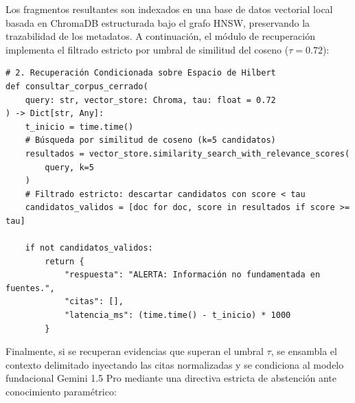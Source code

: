 Los fragmentos resultantes son indexados en una base de datos vectorial local basada en ChromaDB estructurada bajo el grafo HNSW, preservando la trazabilidad de los metadatos. A continuación, el módulo de recuperación implementa el filtrado estricto por umbral de similitud del coseno ($\tau = 0.72$):

\begin{tcolorbox}[colback=bg_marfil, colframe=unmsm_gold, arc=3pt, boxrule=0.6pt, top=0.2cm, bottom=0.2cm, left=0.4cm, right=0.4cm]
\footnotesize
\begin{verbatim}
# 2. Recuperación Condicionada sobre Espacio de Hilbert
def consultar_corpus_cerrado(
    query: str, vector_store: Chroma, tau: float = 0.72
) -> Dict[str, Any]:
    t_inicio = time.time()
    # Búsqueda por similitud de coseno (k=5 candidatos)
    resultados = vector_store.similarity_search_with_relevance_scores(
        query, k=5
    )
    # Filtrado estricto: descartar candidatos con score < tau
    candidatos_validos = [doc for doc, score in resultados if score >= tau]
    
    if not candidatos_validos:
        return {
            "respuesta": "ALERTA: Información no fundamentada en fuentes.",
            "citas": [],
            "latencia_ms": (time.time() - t_inicio) * 1000
        }
\end{verbatim}
\end{tcolorbox}

Finalmente, si se recuperan evidencias que superan el umbral $\tau$, se ensambla el contexto delimitado inyectando las citas normalizadas y se condiciona al modelo fundacional Gemini 1.5 Pro mediante una directiva estricta de abstención ante conocimiento paramétrico:

